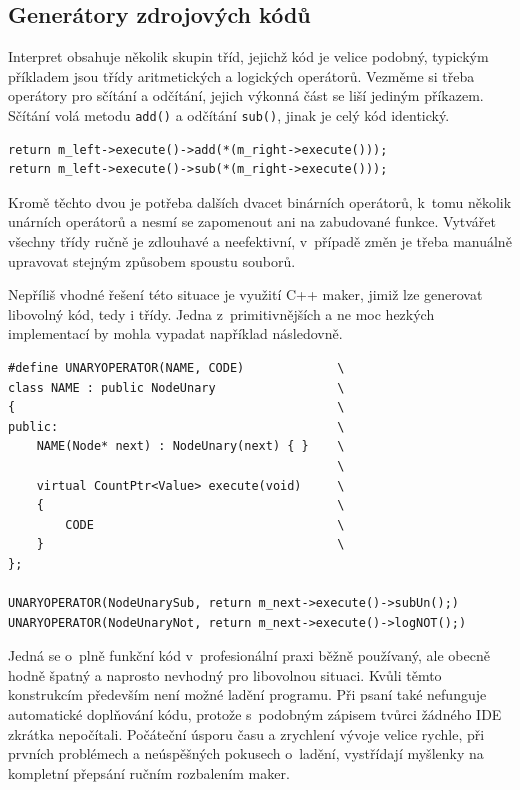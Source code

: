 \documentclass[11pt,twoside,a4paper]{book}
\begin{document}
\subsection{Generátory zdrojových kódů}

Interpret obsahuje několik skupin tříd, jejichž kód je velice podobný, typickým příkladem jsou třídy aritmetických a logických operátorů. Vezměme si třeba operátory pro sčítání a odčítání, jejich výkonná část se liší jediným příkazem. Sčítání volá metodu \texttt{add()} a odčítání \texttt{sub()}, jinak je celý kód identický.

\begin{verbatim}
return m_left->execute()->add(*(m_right->execute()));
return m_left->execute()->sub(*(m_right->execute()));
\end{verbatim}

Kromě těchto dvou je potřeba dalších dvacet binárních operátorů, k~tomu několik unárních operátorů a nesmí se zapomenout ani na zabudované funkce. Vytvářet všechny třídy ručně je zdlouhavé a neefektivní, v~případě změn je třeba manuálně upravovat stejným způsobem spoustu souborů.

Nepříliš vhodné řešení této situace je využití C++ maker, jimiž lze generovat libovolný kód, tedy i třídy. Jedna z~primitivnějších a ne moc hezkých implementací by mohla vypadat například následovně.

\begin{verbatim}
#define UNARYOPERATOR(NAME, CODE)             \
class NAME : public NodeUnary                 \
{                                             \
public:                                       \
    NAME(Node* next) : NodeUnary(next) { }    \
                                              \
    virtual CountPtr<Value> execute(void)     \
    {                                         \
        CODE                                  \
    }                                         \
};

UNARYOPERATOR(NodeUnarySub, return m_next->execute()->subUn();)
UNARYOPERATOR(NodeUnaryNot, return m_next->execute()->logNOT();)
\end{verbatim}

Jedná se o~plně funkční kód v~profesionální praxi běžně používaný, ale obecně hodně špatný a naprosto nevhodný pro libovolnou situaci. Kvůli těmto konstrukcím především není možné ladění programu. Při psaní také nefunguje automatické do\-pl\-ňo\-vá\-ní kódu, protože s~podobným zápisem tvůrci žádného IDE zkrátka nepočítali. Počáteční úsporu času a zrychlení vývoje velice rychle, při prvních problémech a neúspěšných pokusech o~ladění, vystřídají myšlenky na kompletní přepsání ručním rozbalením maker.
\end{document}
